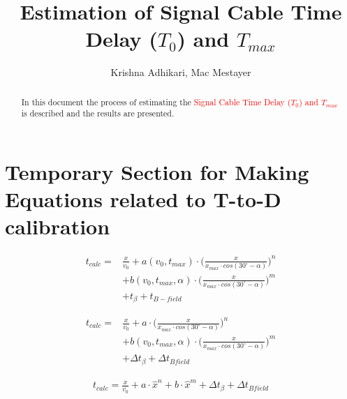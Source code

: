 \documentclass[12pt,epsfig]{article}
\begin{document}
\title{Estimation of Signal Cable Time Delay ($T_0$) and $T_{max}$}
\author{Krishna Adhikari, Mac Mestayer}

\maketitle

\begin{abstract}
In this document the process of estimating the \textcolor{red}{Signal Cable Time Delay ($T_0$) and $T_{max}$} 
is described and the results are presented. %
\end{abstract}

\tableofcontents

\pagebreak

\section{Temporary Section for Making Equations related to T-to-D calibration}


\begin{equation}
\label{T2DCor1}
\begin{aligned}
  t_{calc}   = & \frac{x}{v_0} + a(v_0, t_{max})\cdot \Big( \frac{x}{x_{max}\cdot cos(30^{\circ} - \alpha)} \Big)^n \\
   & + b(v_0,t_{max},\alpha)\cdot \Big( \frac{x}{x_{max}\cdot cos(30^{\circ} - \alpha)} \Big)^m \\
   & + t_{\beta} + t_{B-field}
\end{aligned}
\end{equation}


\begin{equation}
\label{T2DCor2}
\begin{aligned}
  t_{calc}   = & \frac{x}{v_0} + a\cdot \Big( \frac{x}{x_{max}\cdot cos(30^{\circ} - \alpha)} \Big)^n \\
   & + b(v_0,t_{max},\alpha)\cdot \Big( \frac{x}{x_{max}\cdot cos(30^{\circ} - \alpha)} \Big)^m \\
   & + \Delta t_{\beta} + \Delta t_{Bfield}
\end{aligned}
\end{equation}

\begin{equation}
\label{T2DCor2}
\begin{aligned}
  t_{calc}   =  \frac{x}{v_0} + a\cdot \hat{x}^n + b\cdot \hat{x}^m  + \Delta t_{\beta} + \Delta t_{Bfield}
\end{aligned}
\end{equation}
\end{document}
